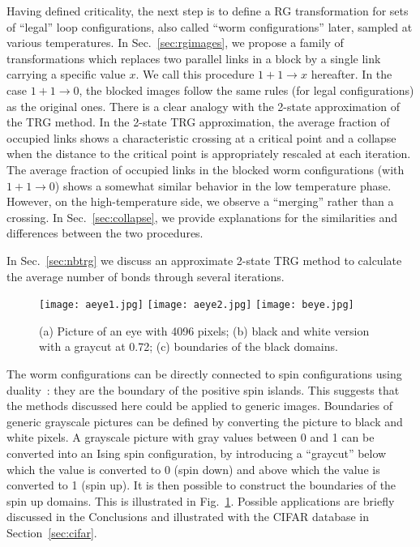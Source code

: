 \documentclass[../main.tex]{subfiles}
\begin{document}
Having defined criticality, the next step is to define a RG transformation for sets of ``legal'' loop configurations,
also called ``worm configurations'' later, sampled at various temperatures.
%
In Sec.~\ref{sec:rgimages},  we propose a family of transformations which replaces two parallel links in a block by a
single link carrying a specific value $x$.  We call this procedure $1+1\rightarrow x$ hereafter.
%
In the case $1+1\rightarrow 0$, the blocked images follow the same rules (for legal configurations) as the original
ones.
%
There is a clear analogy with the 2-state approximation of the TRG method.
%
In the 2-state TRG approximation, the average fraction of occupied links shows a characteristic crossing at a critical
point and a collapse when the distance to the critical point is appropriately rescaled at each iteration.
%
The average fraction of occupied links in the blocked worm configurations (with $1+1\rightarrow 0$) shows a somewhat
similar behavior in the low temperature phase.
%
However, on the high-temperature side, we observe a ``merging'' rather than a crossing.
%
In Sec.~\ref{sec:collapse},  we provide explanations for the similarities and differences between the two procedures.

In Sec.~\ref{sec:nbtrg} we discuss an approximate 2-state TRG method to calculate the average number of bonds through
several iterations.
%
\begin{figure}[htpb]
    \centering 
    \texttt{[image: aeye1.jpg]}
    \hfill
    \texttt{[image: aeye2.jpg]}%
    \hfill
    \texttt{[image: beye.jpg]}%
    \hfill
    \caption{\label{fig:eye} (a) Picture of an eye with 4096 pixels; (b) black
    and white version with a graycut at 0.72; (c) boundaries of the black
    domains.}
\end{figure}
%
The worm configurations can be directly connected to spin configurations using duality~\cite{RevModPhys.52.453}: they
are the boundary of the positive spin islands.
%
This suggests that the methods discussed here could be applied to generic images.
%
Boundaries of generic grayscale pictures can be defined by converting the picture to black and white pixels.
%
A grayscale picture with gray values between 0 and 1 can be converted into an Ising spin configuration, by introducing
a ``graycut'' below which the value is converted to 0 (spin down) and above which the value is converted to 1 (spin
up).
%
It is then possible to construct the boundaries of the spin up domains.
%
This is illustrated in Fig.~\ref{fig:eye}.
%
Possible applications are briefly discussed in the Conclusions and illustrated with the CIFAR database in
Section~\ref{sec:cifar}. 
\end{document}
